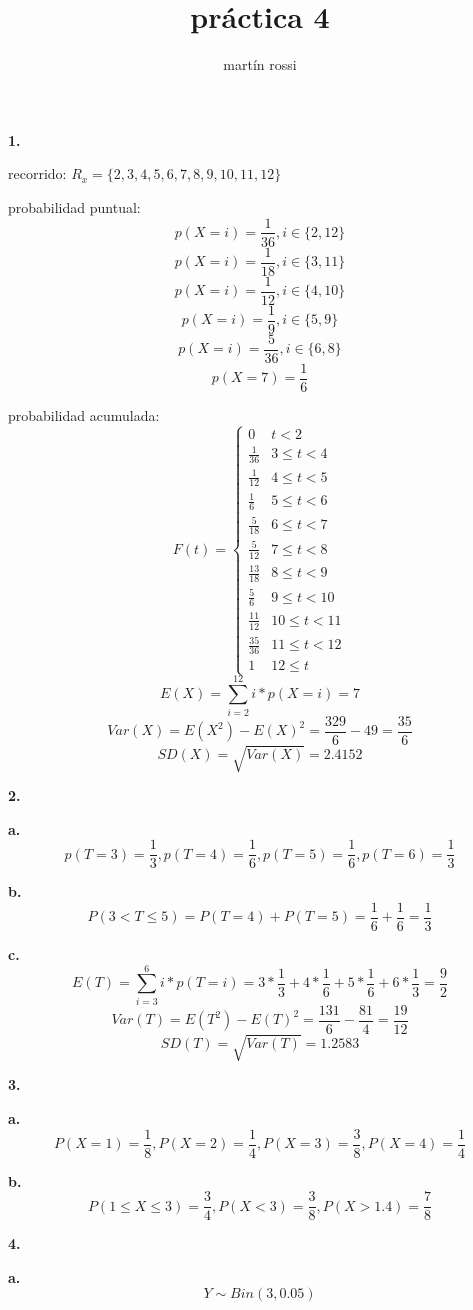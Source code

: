 \documentclass[12pt,fleqn]{article}
\title{práctica 4}
\author{martín rossi}
\date{}
\begin{document}
\maketitle
\textbf{1.}

recorrido: $R_x=\{2,3,4,5,6,7,8,9,10,11,12\}$

probabilidad puntual:
\[p(X=i)=\frac{1}{36}, i\in\{2,12\}\]
\[p(X=i)=\frac{1}{18}, i\in\{3,11\}\]
\[p(X=i)=\frac{1}{12}, i\in\{4,10\}\]
\[p(X=i)=\frac{1}{9}, i\in\{5,9\}\]
\[p(X=i)=\frac{5}{36}, i\in\{6,8\}\]
\[p(X=7)=\frac{1}{6}\]

probabilidad acumulada:
\[
  F(t)=
  \begin{cases}
    0&t<2\\
    \frac{1}{36}&3 \le t < 4\\
    \frac{1}{12}&4 \le t < 5\\
    \frac{1}{6}&5 \le t < 6\\
    \frac{5}{18}&6 \le t < 7\\
    \frac{5}{12}&7 \le t < 8\\
    \frac{13}{18}&8 \le t < 9\\
    \frac{5}{6}&9 \le t < 10\\
    \frac{11}{12}&10 \le t < 11\\
    \frac{35}{36}&11 \le t < 12\\
    1&12 \le t
  \end{cases}
\]
\[E(X)=\sum_{i=2}^{12} i*p(X=i)=7\]
\[Var(X)=E(X^2)-E(X)^2=\frac{329}{6}-49=\frac{35}{6}\]
\[SD(X)=\sqrt{Var(X)}=2.4152\]

\textbf{2.}

\textbf{a.}\[p(T=3)=\frac{1}{3}, p(T=4)=\frac{1}{6}, p(T=5)=\frac{1}{6}, p(T=6)=\frac{1}{3}\]

\textbf{b.}\[P(3<T \le 5)=P(T=4)+P(T=5)=\frac{1}{6}+\frac{1}{6}=\frac{1}{3}\]

\textbf{c.}\[E(T)=\sum_{i=3}^{6} i*p(T=i)=3*\frac{1}{3}+4*\frac{1}{6}+5*\frac{1}{6}+6*\frac{1}{3}=\frac{9}{2}\]
\[Var(T)=E(T^2)-E(T)^2=\frac{131}{6}-\frac{81}{4}=\frac{19}{12}\]
\[SD(T)=\sqrt{Var(T)}=1.2583\]

\textbf{3.}

\textbf{a.}\[P(X=1)=\frac{1}{8},P(X=2)=\frac{1}{4},P(X=3)=\frac{3}{8},P(X=4)=\frac{1}{4}\]

\textbf{b.}\[P(1 \le X \le 3)=\frac{3}{4},P(X<3)=\frac{3}{8},P(X>1.4)=\frac{7}{8}\]

\textbf{4.}

\textbf{a.}\[Y \sim Bin(3,0.05)\]
\end{document}
